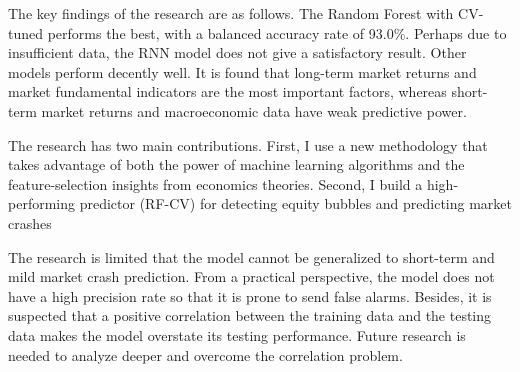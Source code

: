 \documentclass[12pt, man, a4paper, floatsintext]{apa7}
\begin{document}
The key findings of the research are as follows. The Random Forest with CV-tuned performs the best, with a balanced accuracy rate of 93.0\%. Perhaps due to insufficient data, the RNN model does not give a satisfactory result. Other models perform decently well. It is found that long-term market returns and market fundamental indicators are the most important factors, whereas short-term market returns and macroeconomic data have weak predictive power. 

The research has two main contributions. First, I use a new methodology that takes advantage of both the power of machine learning algorithms and the feature-selection insights from economics theories. Second, I build a high-performing predictor (RF-CV) for detecting equity bubbles and predicting market crashes

The research is limited that the model cannot be generalized to short-term and mild market crash prediction. From a practical perspective, the model does not have a high precision rate so that it is prone to send false alarms. Besides, it is suspected that a positive correlation between the training data and the testing data makes the model overstate its testing performance. Future research is needed to analyze deeper and overcome the correlation problem.

    \clearpage

    \printbibliography
\end{document}
